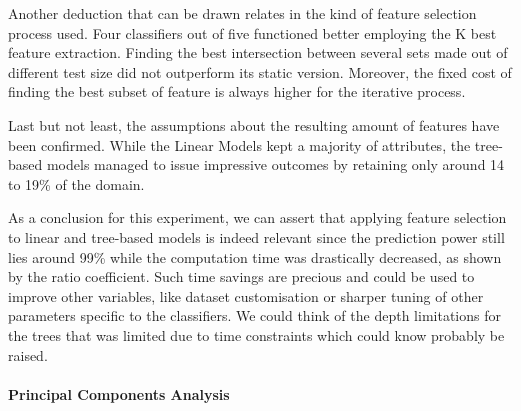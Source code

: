Another deduction that can be drawn relates in the kind of feature selection process used. Four classifiers out of five functioned better employing the K best feature extraction. Finding the best intersection between several sets made out of different test size did not outperform its static version. Moreover, the fixed cost of finding the best subset of feature is always higher for the iterative process.

Last but not least, the assumptions about the resulting amount of features have been confirmed. While the Linear Models kept a majority of attributes, the tree-based models managed to issue impressive outcomes by retaining only around 14 to 19\% of the domain.

As a conclusion for this experiment, we can assert that applying feature selection to linear and tree-based models is indeed relevant since the prediction power still lies around 99\% while the computation time was drastically decreased, as shown by the ratio coefficient. Such time savings are precious and could be used to improve other variables, like dataset customisation or sharper tuning of other parameters specific to the classifiers. We could think of the depth limitations for the trees that was limited due to time constraints which could know probably be raised.

\paragraph{Principal Components Analysis}

